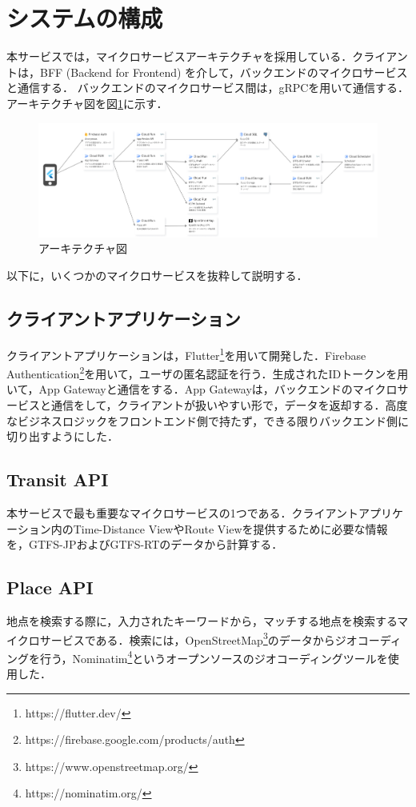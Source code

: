\section{システムの構成}
本サービスでは，マイクロサービスアーキテクチャを採用している．クライアントは，BFF (Backend for Frontend) を介して，バックエンドのマイクロサービスと通信する．
バックエンドのマイクロサービス間は，gRPCを用いて通信する．アーキテクチャ図を図\ref{fig:architecture}に示す．
\begin{figure}[H]
    \centering
    \includegraphics[width=14cm]{images/architecture_diagram.png}
    \caption{アーキテクチャ図}
    \label{fig:architecture}
\end{figure}
以下に，いくつかのマイクロサービスを抜粋して説明する．

\subsection{クライアントアプリケーション}
クライアントアプリケーションは，Flutter\footnote{https://flutter.dev/}を用いて開発した．Firebase Authentication\footnote{https://firebase.google.com/products/auth}を用いて，ユーザの匿名認証を行う．生成されたIDトークンを用いて，App Gatewayと通信をする．App Gatewayは，バックエンドのマイクロサービスと通信をして，クライアントが扱いやすい形で，データを返却する．高度なビジネスロジックをフロントエンド側で持たず，できる限りバックエンド側に切り出すようにした．

\subsection{Transit API}
本サービスで最も重要なマイクロサービスの1つである．クライアントアプリケーション内のTime-Distance ViewやRoute Viewを提供するために必要な情報を，GTFS-JPおよびGTFS-RTのデータから計算する．

\subsection{Place API}
地点を検索する際に，入力されたキーワードから，マッチする地点を検索するマイクロサービスである．検索には，OpenStreetMap\footnote{https://www.openstreetmap.org/}のデータからジオコーディングを行う，Nominatim\footnote{https://nominatim.org/}というオープンソースのジオコーディングツールを使用した．
